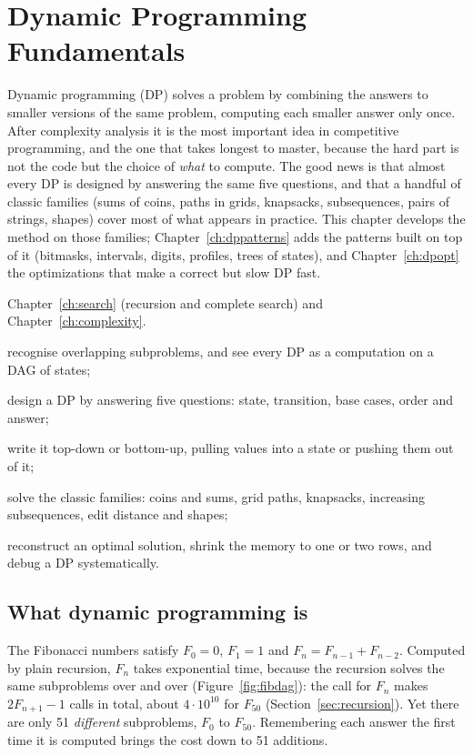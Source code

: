 \chapter{Dynamic Programming Fundamentals}\label{ch:dp}

Dynamic programming (DP) solves a problem by combining the answers to smaller versions of the same problem, computing each
smaller answer only once. After complexity analysis it is the most important idea in competitive programming, and the one that
takes longest to master, because the hard part is not the code but the choice of \emph{what} to compute. The good news is that
almost every DP is designed by answering the same five questions, and that a handful of classic families (sums of coins, paths in
grids, knapsacks, subsequences, pairs of strings, shapes) cover most of what appears in practice. This chapter develops the method on
those families; Chapter~\ref{ch:dppatterns} adds the patterns built on top of it (bitmasks, intervals, digits, profiles, trees of
states), and Chapter~\ref{ch:dpopt} the optimizations that make a correct but slow DP fast.

\begin{chapterintro}{\gold}{Chapter~\ref{ch:search} (recursion and complete search) and Chapter~\ref{ch:complexity}.}
  \item recognise overlapping subproblems, and see every DP as a computation on a DAG of states;
  \item design a DP by answering five questions: state, transition, base cases, order and answer;
  \item write it top-down or bottom-up, pulling values into a state or pushing them out of it;
  \item solve the classic families: coins and sums, grid paths, knapsacks, increasing subsequences, edit distance and shapes;
  \item reconstruct an optimal solution, shrink the memory to one or two rows, and debug a DP systematically.
\end{chapterintro}

\section[What DP is]{What dynamic programming is \hfill \gold}\label{sec:dp-what}

The Fibonacci numbers satisfy $F_0 = 0$, $F_1 = 1$ and $F_n = F_{n-1} + F_{n-2}$. Computed by plain recursion, $F_n$ takes
exponential time, because the recursion solves the same subproblems over and over (Figure~\ref{fig:fibdag}): the call for $F_n$
makes $2F_{n+1} - 1$ calls in total, about $4 \cdot 10^{10}$ for $F_{50}$ (Section~\ref{sec:recursion}). Yet there are only 51
\emph{different} subproblems, $F_0$ to $F_{50}$. Remembering each answer the first time it is computed brings the cost down to 51
additions.

